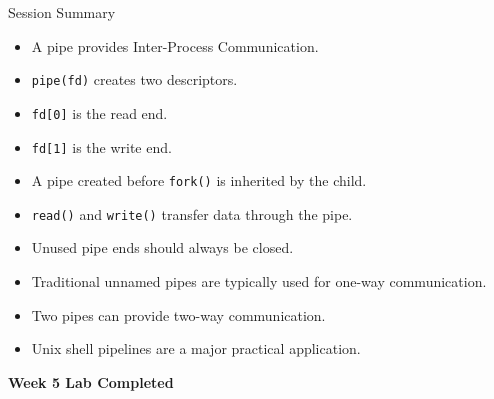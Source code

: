 \documentclass[aspectratio=169]{beamer}
\begin{document}
\begin{frame}{Session Summary}

\begin{itemize}

    \item A pipe provides Inter-Process Communication.

    \item \texttt{pipe(fd)} creates two descriptors.

    \item \texttt{fd[0]} is the read end.

    \item \texttt{fd[1]} is the write end.

    \item A pipe created before \texttt{fork()} is inherited by the child.

    \item \texttt{read()} and \texttt{write()} transfer data through the pipe.

    \item Unused pipe ends should always be closed.

    \item Traditional unnamed pipes are typically used for one-way communication.

    \item Two pipes can provide two-way communication.

    \item Unix shell pipelines are a major practical application.

\end{itemize}

\vspace{0.3cm}

\begin{center}
\Large
\textbf{Week 5 Lab Completed}
\end{center}

\end{frame}
\end{document}
